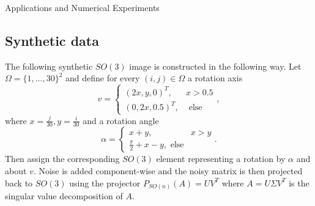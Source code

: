 \begin{chapter}{Applications and Numerical Experiments}
\subsection{Synthetic data} %
\label{sub:Synthetic data}
The following synthetic $SO(3)$ image is constructed in the following way. Let $\Omega=\lbrace 1,\ldots,30 \rbrace^2$ and define for every $(i,j)\in\Omega$
a rotation axis
\begin{equation}
	v = \begin{cases}
	    (2x,y,0)^{T}, & x>0.5\\
	    (0,2x,0.5)^{T}, & \text{ else}
	\end{cases},
\end{equation}
where $x=\frac{j}{30}, y=\frac{i}{30}$ and a rotation angle
\begin{equation}
    \alpha = \begin{cases}
	   x + y, & x > y\\
	   \frac{\pi}{2} + x - y, \text{ else}
    \end{cases}.
\end{equation}
Then assign the corresponding $SO(3)$ element representing a rotation by $\alpha$ and about $v$. Noise is added component-wise and the noisy matrix is
then projected back to $SO(3)$ using the projector $P_{SO(n)}(A)=UV^{T}$ where $A=U\Sigma V^T$ is the singular value decomposition of $A$.


\end{chapter}

